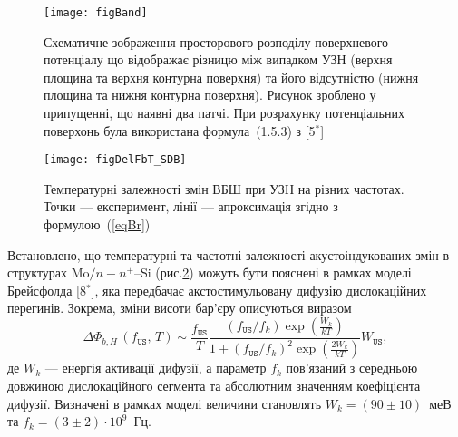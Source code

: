 \begin{figure}
\center
\texttt{[image: figBand]}
\caption{\label{figBand}
Схематичне зображення
просторового розподілу поверхневого потенціалу
що відображає різницю між випадком УЗН (верхня площина та верхня контурна поверхня) та
його відсутністю (нижня площина та нижня контурна поверхня).
Рисунок зроблено у припущенні, що наявні два патчі.
При розрахунку потенціальних поверхонь була використана формула~(1.5.3) з
[5$^*$]
}%
\end{figure}

\begin{figure}[b]
\center
\texttt{[image: figDelFbT\_SDB]}
\caption{\label{figDelFbT_SDB}
Температурні залежності змін ВБШ при УЗН на різних частотах.
Точки --- експеримент,
лінії --- апроксимація згідно з формулою~(\ref{eqBr})
}%
\end{figure}
Встановлено, що температурні та частотні залежності акустоіндукованих змін в структурах
 Mo$/n-n^+$--Si (рис.\ref{figDelFbT_SDB}) можуть бути пояснені в рамках моделі Брейсфолда
[8$^*$],
яка передбачає акстостимульовану дифузію дислокаційних перегинів.
Зокрема, зміни висоти бар'єру описуються виразом
\begin{equation}
\label{eqBr}
\Delta\Phi_{b,H}\,(f_\mathtt{US},\,T)\sim\frac{f_\mathtt{US}}{T}\frac{(f_\mathtt{US}/{f_k})\exp\left(\frac{W_k}{kT}\right)}
{1+(f_\mathtt{US}/{f_k})^2\exp\left(\frac{2W_k}{kT}\right)}W_\mathtt{US},
\end{equation}
де
$W_k$ --- енергія активації дифузії,
а параметр $f_k$ пов'язаний з середньою довжиною дислокаційного сегмента та абсолютним значенням коефіцієнта дифузії.
Визначені в рамках моделі величини становлять $W_k=(90\pm10)$~меВ та $f_k=(3\pm2)\cdot10^9$~Гц.


